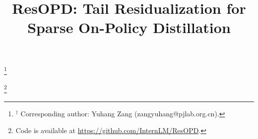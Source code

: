 \documentclass{template}
\title{ResOPD: Tail Residualization for Sparse On-Policy Distillation}
\newcommand\blfootnote[1]{%
  \begingroup
  \renewcommand\thefootnote{}\footnote{#1}%
  \addtocounter{footnote}{-1}%
  \endgroup
}
\begin{document}
\blfootnote{$^\dagger$ Corresponding author: Yuhang Zang (zangyuhang@pjlab.org.cn).}
\blfootnote{Code is available at \url{https://github.com/InternLM/ResOPD}.}

\maketitle




\FloatBarrier

\FloatBarrier


\FloatBarrier

\renewcommand{\bibfont}{\small}
\setlength{\bibsep}{3pt plus 1pt minus 1pt}



\clearpage

\end{document}
